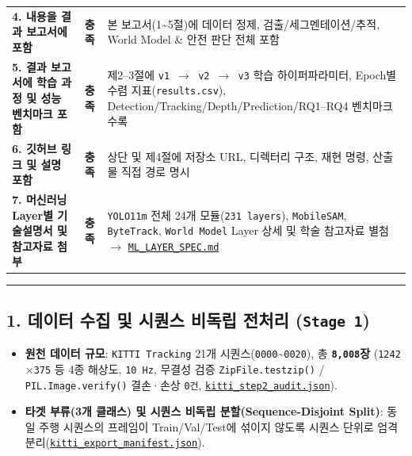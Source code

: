 \documentclass[10.5pt,a4paper]{article}
\begin{document}
\begin{footnotesize}
\begin{longtable}{>{\raggedright\arraybackslash}p{} >{\raggedright\arraybackslash}p{} >{\raggedright\arraybackslash}p{}}
\textbf{4. 내용을 결과 보고서에 포함} & \textbf{충족} & 본 보고서(1\textasciitilde{}5절)에 데이터 정제, 검출/세그멘테이션/추적, World Model \& 안전 판단 전체 포함 \\
\textbf{5. 결과 보고서에 학습 과정 및 성능 벤치마크 포함} & \textbf{충족} & 제2--3절에 \texttt{v1 $\rightarrow$ v2 $\rightarrow$ v3} 학습 하이퍼파라미터, Epoch별 수렴 지표(\texttt{results.\allowbreak{}csv}), Detection/Tracking/Depth/Prediction/RQ1--RQ4 벤치마크 수록 \\
\textbf{6. 깃허브 링크 및 설명 포함} & \textbf{충족} & 상단 및 제4절에 저장소 URL, 디렉터리 구조, 재현 명령, 산출물 직접 경로 명시 \\
\textbf{7. 머신러닝 Layer별 기술설명서 및 참고자료 첨부} & \textbf{충족} & \texttt{YOLO11m} 전체 24개 모듈(\texttt{231 layers}), \texttt{MobileSAM}, \texttt{ByteTrack}, \texttt{World Model} Layer 상세 및 학술 참고자료 별첨 $\rightarrow$ \href{https://github.com/Heisnotanimposter/Totalcare\_autonomous\_driving\_Yolov5/blob/main/ML\_LAYER\_SPEC.md}{\texttt{ML\_\allowbreak{}LAYER\_\allowbreak{}SPEC.\allowbreak{}md}} \\
\end{longtable}
\end{footnotesize}


\par\noindent\rule{\textwidth}{0.4pt}\par\medskip

\subsection{1. 데이터 수집 및 시퀀스 비독립 전처리 (\texttt{Stage 1})}

\begin{itemize}[leftmargin=1.5em,itemsep=2pt]
\item \textbf{원천 데이터 규모}: \texttt{KITTI Tracking} 21개 시퀀스(\texttt{0000}\textasciitilde{}\texttt{0020}), 총 \textbf{\texttt{8,\allowbreak{}008}장} (\texttt{1242$\times$375} 등 4종 해상도, \texttt{10 Hz}, 무결성 검증 \texttt{ZipFile.\allowbreak{}testzip()} / \texttt{PIL.\allowbreak{}Image.\allowbreak{}verify()} 결손·손상 \texttt{0건}, \href{https://github.com/Heisnotanimposter/Totalcare\_autonomous\_driving\_Yolov5/blob/main/results/v2\_improved/outputs/kitti\_step2\_audit.json}{\texttt{kitti\_\allowbreak{}step2\_\allowbreak{}audit.\allowbreak{}json}}).
\item \textbf{타겟 부류(3개 클래스) 및 시퀀스 비독립 분할(Sequence-Disjoint Split)}: 동일 주행 시퀀스의 프레임이 Train/Val/Test에 섞이지 않도록 시퀀스 단위로 엄격 분리(\href{https://github.com/Heisnotanimposter/Totalcare\_autonomous\_driving\_Yolov5/blob/main/results/v2\_improved/outputs/kitti\_export\_manifest.json}{\texttt{kitti\_\allowbreak{}export\_\allowbreak{}manifest.\allowbreak{}json}}).
\end{itemize}
\end{document}
